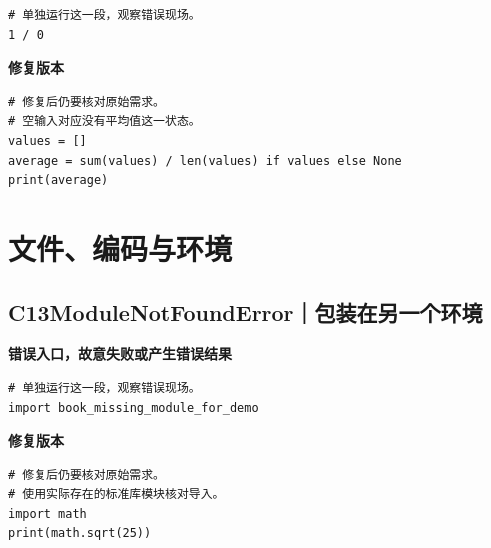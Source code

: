 \begin{lstlisting}[style=errorcode,title={错误复现（故意失败或错误结果）：\code{case_12_bad.py.txt}}]
# 单独运行这一段，观察错误现场。
1 / 0
\end{lstlisting}

\textbf{修复版本}

\begin{lstlisting}[title={\code{case_12.py}}]
# 修复后仍要核对原始需求。
# 空输入对应没有平均值这一状态。
values = []
average = sum(values) / len(values) if values else None
print(average)
\end{lstlisting}


\section{文件、编码与环境}

\subsection*{C13\enspace ModuleNotFoundError｜包装在另一个环境}





\textbf{错误入口，故意失败或产生错误结果}

\begin{lstlisting}[style=errorcode,title={错误复现（故意失败或错误结果）：\code{case_13_bad.py.txt}}]
# 单独运行这一段，观察错误现场。
import book_missing_module_for_demo
\end{lstlisting}

\textbf{修复版本}

\begin{lstlisting}[title={\code{case_13.py}}]
# 修复后仍要核对原始需求。
# 使用实际存在的标准库模块核对导入。
import math
print(math.sqrt(25))
\end{lstlisting}


